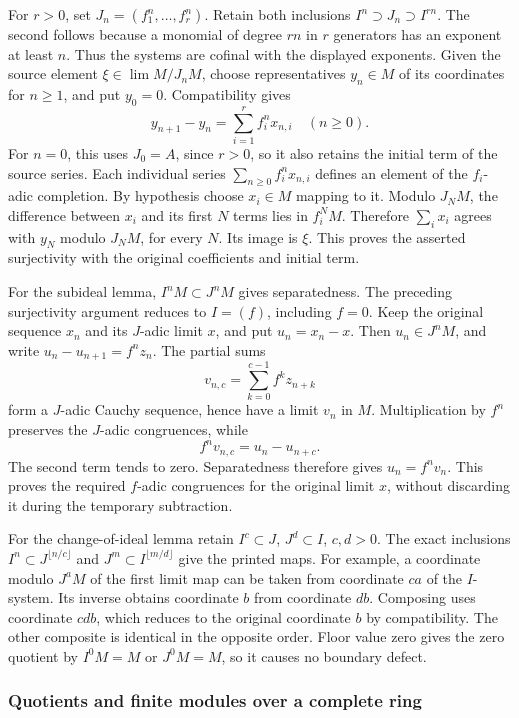 For \(r>0\), set \(J_n=(f_1^n,\ldots,f_r^n)\). Retain both inclusions \(I^n\supset J_n\supset I^{rn}\). The second follows because a monomial of degree \(rn\) in \(r\) generators has an exponent at least \(n\). Thus the systems are cofinal with the displayed exponents. Given the source element \(\xi\in\lim M/J_nM\), choose representatives \(y_n\in M\) of its coordinates for \(n\geq1\), and put \(y_0=0\). Compatibility gives \[
y_{n+1}-y_n=\sum_{i=1}^r f_i^n x_{n,i}\quad(n\geq0).
\] For \(n=0\), this uses \(J_0=A\), since \(r>0\), so it also retains the initial term of the source series. Each individual series \(\sum_{n\geq0}f_i^nx_{n,i}\) defines an element of the \(f_i\)-adic completion. By hypothesis choose \(x_i\in M\) mapping to it. Modulo \(J_NM\), the difference between \(x_i\) and its first \(N\) terms lies in \(f_i^NM\). Therefore \(\sum_i x_i\) agrees with \(y_N\) modulo \(J_NM\), for every \(N\). Its image is \(\xi\). This proves the asserted surjectivity with the original coefficients and initial term.

For the subideal lemma, \(I^nM\subset J^nM\) gives separatedness. The preceding surjectivity argument reduces to \(I=(f)\), including \(f=0\). Keep the original sequence \(x_n\) and its \(J\)-adic limit \(x\), and put \(u_n=x_n-x\). Then \(u_n\in J^nM\), and write \(u_n-u_{n+1}=f^nz_n\). The partial sums \[
v_{n,c}=\sum_{k=0}^{c-1}f^kz_{n+k}
\] form a \(J\)-adic Cauchy sequence, hence have a limit \(v_n\) in \(M\). Multiplication by \(f^n\) preserves the \(J\)-adic congruences, while \[
f^nv_{n,c}=u_n-u_{n+c}.
\] The second term tends to zero. Separatedness therefore gives \(u_n=f^nv_n\). This proves the required \(f\)-adic congruences for the original limit \(x\), without discarding it during the temporary subtraction.

For the change-of-ideal lemma retain \(I^c\subset J\), \(J^d\subset I\), \(c,d>0\). The exact inclusions \(I^n\subset J^{\lfloor n/c\rfloor}\) and \(J^m\subset I^{\lfloor m/d\rfloor}\) give the printed maps. For example, a coordinate modulo \(J^aM\) of the first limit map can be taken from coordinate \(ca\) of the \(I\)-system. Its inverse obtains coordinate \(b\) from coordinate \(db\). Composing uses coordinate \(cdb\), which reduces to the original coordinate \(b\) by compatibility. The other composite is identical in the opposite order. Floor value zero gives the zero quotient by \(I^0M=M\) or \(J^0M=M\), so it causes no boundary defect.

\subsubsection{Quotients and finite modules over a complete ring}\label{quotients-and-finite-modules-over-a-complete-ring}

